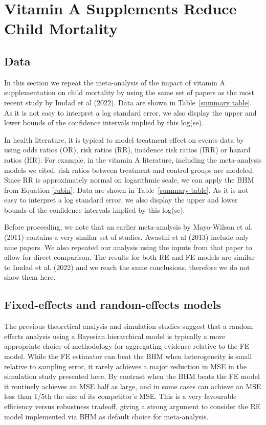 \documentclass[12pt]{article}
\begin{document}
\section{Vitamin A Supplements Reduce Child Mortality}

\subsection{Data}

In this section we repeat the meta-analysis of the impact of vitamin A supplementation on child mortality by using the same set of papers as the most recent study by Imdad et al (2022). Data are shown in Table~\ref{summary table}. 
As it is not easy to interpret a log standard error, we also display the upper and lower bounds of the confidence intervals implied by this log(se). 



In health literature, it is typical to model treatment effect on events data by using odds ratios (OR), risk ratios (RR), incidence risk ratios (IRR) or hazard ratios (HR). For example, in the vitamin A literature, including the meta-analysis models we cited, risk ratios between treatment and control groups are modeled. Since RR is approximately normal on logarithmic scale, we can apply the BHM from Equation \eqref{rubin}. Data are shown in Table~\ref{summary table}. As it is not easy to interpret a log standard error, we also display the upper and lower bounds of the confidence intervals implied by this log(se).


Before proceeding, we note that an earlier meta-analysis by Mayo-Wilson et al. (2011) contains a very similar set of studies. Awasthi et al (2013) include only nine papers. We also repeated our analysis using the inputs from that paper to allow for direct comparison. The results for both RE and FE models are similar to Imdad et al. (2022) and we reach the same conclusions, therefore we do not show them here.


\subsection{Fixed-effects and random-effects models}

The previous theoretical analysis and simulation studies suggest that a random effects analysis using a Bayesian hierarchical model is typically a more appropriate choice of methodology for aggregating evidence relative to the FE model. While the FE estimator can beat the BHM when heterogeneity is small relative to sampling error, it rarely achieves a major reduction in MSE in the simulation study presented here. By contrast when the BHM beats the FE model it routinely achieves an MSE half as large, and in some cases can achieve an MSE less than 1/5th the size of its competitor's MSE. This is a very favourable efficiency versus robustness tradeoff, giving a strong argument to consider the RE model implemented via BHM as default choice for meta-analysis. 
\end{document}
